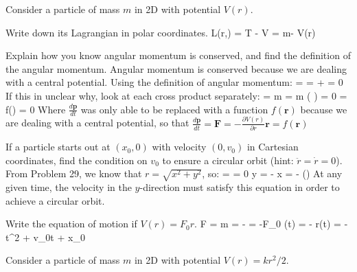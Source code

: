 
Consider a particle of mass $m$ in 2D with potential $V(r)$.

\benu
\item Write down its Lagrangian in polar coordinates.
\be
L(r,\theta) = T - V = m - V(r)
\ee
\item Explain how you know angular momentum is conserved, and find the definition of the angular momentum.
\newline Angular momentum is conserved because we are dealing with a central potential. Using the definition of angular momentum:
\be
{} =  \times {} \thus {} =  \times {} +  \times {} = 0
\ee
If this in unclear why, look at each cross product separately:
\be
{} \times {} =  \times m = m \left(  \times {} \right) = 0 \quad\quad\quad {} \times {} =  \times f() = 0
\ee
Where $\frac{d\boldsymbol{p}}{dt}$ was only able to be replaced with a function $f(\boldsymbol{r})$ because we are dealing with a central potential, so that $\frac{d\boldsymbol{p}}{dt} = \boldsymbol{F} = -\frac{\partial V(r)}{\partial r}\boldsymbol{r} = f(\boldsymbol{r})$
\item If a particle starts out at $(x_0,0)$ with velocity $(0,v_0)$ in
Cartesian coordinates, find the condition on $v_0$ to ensure a circular
orbit (hint: $\ddot r = \dot r =0$).
\newline From Problem 29, we know that $r = \sqrt{x^2 + y^2}$, so:
\be
{} =  = 0 \thus y = - x \thus {} = - \left(\right)
\ee
At any given time, the velocity in the $y$-direction must satisfy this equation in order to achieve a circular orbit.
\item Write the equation of motion if $V(r)=F_0 r$.
\be
F = m = - = -F_0 \thus {}(t) = - \thus r(t) = -t^2 + v_0t + x_0
\ee

\enu

\newpage


Consider a particle of mass $m$ in 2D with potential $V(r)=kr^2/2$.

